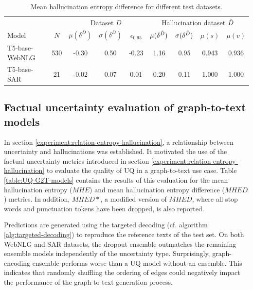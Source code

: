 \begin{table}[ht]
\centering
\caption{Mean hallucination entropy difference for different test datasets. }
\label{table:relationship-entropy-uncertainty}
\begin{tabular}[t]{lcccccccc} %
\toprule
 & & \multicolumn{3}{c}{Dataset $D$} & \multicolumn{4}{c}{Hallucination dataset $\Tilde{D}$} \\
 \cmidrule(rl){3-5} \cmidrule(rl){6-9}
Model      &  $N$   & $\mu(\delta^D)$ & $\sigma(\delta^D)$ & $\epsilon_{0.95}$ & $\mu(\delta^{\Tilde{D}})$ & $\sigma(\delta^{\Tilde{D}})$ & $\mu(s)$ & $\mu(v)$  \\
\midrule
T5-base-WebNLG     & 530 & -0.30 & 0.50 & -0.23 & 1.16 & 0.95 & 0.943 & 0.936 \\
T5-base-SAR         & 21 & -0.02 & 0.07 & 0.01 & 0.20 & 0.11 & 1.000 & 1.000 \\
\bottomrule
\end{tabular}
\end{table}%

\subsection{Factual uncertainty evaluation of graph-to-text models}

In section \ref{experiment:relation-entropy-hallucination}, a relationship between uncertainty and hallucinations was established. It motivated the use of the factual uncertainty metrics introduced in section \ref{experiment:relation-entropy-hallucination} to evaluate the quality of UQ in a graph-to-text use case. Table \ref{table:UQ-G2T-models} contains the results of this evaluation for the mean hallucination entropy ($MHE$) and mean hallucination entropy difference ($MHED$) metrics. In addition, $MHED*$, a modified version of $MHED$, where all stop words and punctuation tokens have been dropped, is also reported.  

Predictions are generated using the targeted decoding (cf. algorithm \ref{alg:targeted-decoding}) to reproduce the reference texts of the test set. On both WebNLG and SAR datasets, the dropout ensemble outmatches the remaining ensemble models independently of the uncertainty type. Surprisingly, graph-encoding ensemble performs worse than a UQ model without an ensemble. This indicates that randomly shuffling the ordering of edges could negatively impact the performance of the graph-to-text generation process.

